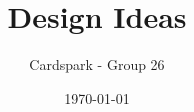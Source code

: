 \documentclass{article}
\begin{document}
\title{Design Ideas}

\author{Cardspark - Group 26}

\date{\today}

\maketitle  
\end{document}
